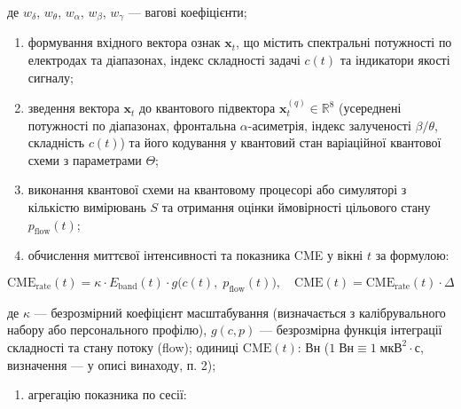 \documentclass[12pt,a4paper]{article}
\begin{document}
де \(w_\delta\), \(w_\theta\), \(w_\alpha\), \(w_\beta\), \(w_\gamma\) --- вагові коефіцієнти;



\begin{enumerate}

\def\labelenumi{(\roman{enumi})}

\setcounter{enumi}{5}

\item

  формування вхідного вектора ознак \(\mathbf{x}_t\), що містить спектральні потужності по електродах та діапазонах, індекс складності задачі \(c(t)\) та індикатори якості сигналу;

\item

  зведення вектора \(\mathbf{x}_t\) до квантового підвектора \(\mathbf{x}_t^{(q)} \in \mathbb{R}^8\) (усереднені потужності по діапазонах, фронтальна \(\alpha\)-асиметрія, індекс залученості \(\beta/\theta\), складність \(c(t)\)) та його кодування у квантовий стан варіаційної квантової схеми з параметрами \(\Theta\);

\item

  виконання квантової схеми на квантовому процесорі або симуляторі з кількістю вимірювань \(S\) та отримання оцінки ймовірності цільового стану \(p_{\text{flow}}(t)\);

\item

  обчислення миттєвої інтенсивності та показника CME у вікні \(t\) за формулою:

\end{enumerate}



\[\text{CME}_{\text{rate}}(t) = \kappa \cdot E_{\text{band}}(t) \cdot g\bigl(c(t),\;p_{\text{flow}}(t)\bigr), \quad \text{CME}(t) = \text{CME}_{\text{rate}}(t) \cdot \Delta\]



де \(\kappa\) --- безрозмірний коефіцієнт масштабування (визначається з калібрувального набору або персонального профілю), \(g(c, p)\) --- безрозмірна функція інтеграції складності та стану потоку (flow); одиниці \(\text{CME}(t)\): Вн (\(1\;\text{Вн} \equiv 1\;\text{мкВ}^2 \cdot \text{с}\), визначення --- у описі винаходу, п. 2);



\begin{enumerate}

\def\labelenumi{(\alph{enumi})}

\setcounter{enumi}{23}

\tightlist

\item

  агрегацію показника по сесії:

\end{enumerate}
\end{document}
